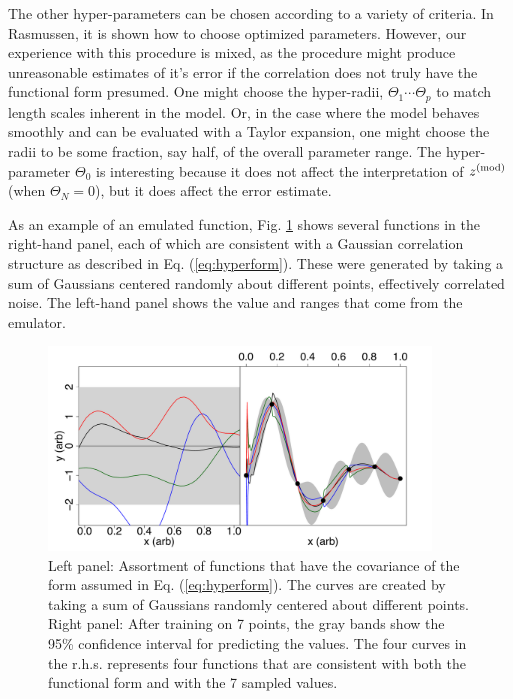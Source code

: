 The other hyper-parameters can be chosen according to a variety of criteria. In Rasmussen, it is shown how to choose optimized parameters. However, our experience with this procedure is mixed, as the procedure might produce unreasonable estimates of it's error if the correlation does not truly have the functional form presumed. One might choose the hyper-radii, $\Theta_1\cdots\Theta_p$ to match length scales inherent in the model. Or, in the case where the model behaves smoothly and can be evaluated with a Taylor expansion, one might choose the radii to be some fraction, say half, of the overall parameter range. The hyper-parameter $\Theta_0$ is interesting because it does not affect the interpretation of $z^{\rm(mod)}$ (when $\Theta_N=0$), but it does affect the error estimate.

As an example of an emulated function, Fig. \ref{fig:emuexample} shows several functions in the right-hand panel, each of which are consistent with a Gaussian correlation structure as described in Eq. (\ref{eq:hyperform}). These were generated by taking a sum of Gaussians centered randomly about different points, effectively correlated noise. The left-hand panel shows the value and ranges that come from the emulator.
\begin{figure}
\includegraphics[width=4in]{figs/gaussian-reals-joined.pdf}
\parbox[b]{3.0in}{\caption{\label{fig:emuexample}
Left panel: Assortment of functions that have the covariance of the form assumed in Eq. (\ref{eq:hyperform}). The curves are created by taking a sum of Gaussians randomly centered about different points. Right panel: After training on 7 points, the gray bands show the 95\% confidence interval for predicting the values. The four curves in the r.h.s. represents four functions that are consistent with both the functional form and with the 7 sampled values.}}
\end{figure}

